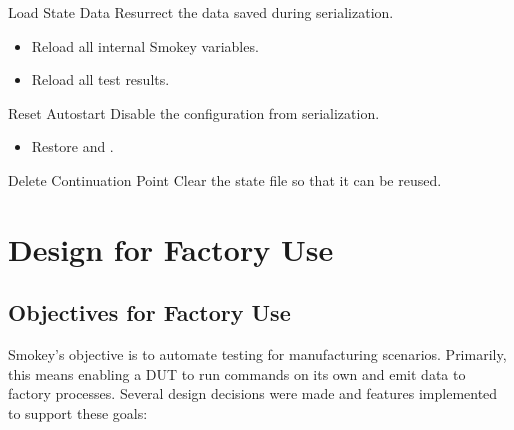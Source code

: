 \begin{Descriptive}

	\item[Load State Data] Resurrect the data saved during serialization.
	\begin{itemize}

		\item Reload all internal Smokey variables.

		\item Reload all test results.

	\end{itemize}

	\item[Reset Autostart] Disable the configuration from serialization.

	\begin{itemize}

		\item Restore  and .

	\end{itemize}

	\item[Delete Continuation Point] Clear the state file so that it can be reused.

\end{Descriptive}


\section{Design for Factory Use}
\label{sec:DesignForFactoryUse}

\subsection{Objectives for Factory Use}

Smokey's objective is to automate testing for manufacturing scenarios.
Primarily, this means enabling a DUT to run commands on its own and emit data
to factory processes.  Several design decisions were made and features
implemented to support these goals:

